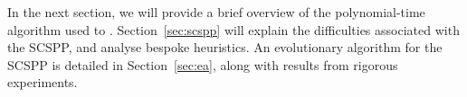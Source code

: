 \documentclass{elsarticle}
\begin{document}
In the next section, we will provide a brief overview of the polynomial-time algorithm used to . Section~\ref{sec:scspp} will explain the difficulties associated with the SCSPP, and analyse bespoke heuristics. An evolutionary algorithm for the SCSPP is detailed in Section~\ref{sec:ea}, along with results from rigorous experiments. 

\begin{comment}
{\color{myOrange}
\begin{itemize}[leftmargin=*]
	\item
	\idone{Lit review, Becker \cite{becker2015}, Lewis \cite{lewis2011} (Lewis TSP method), Hawa \cite{hawa2018}, cite Garraffa \cite{garraffa2016}.}
	\idone{MGPs, cite Lewis \cite{lewis2009}, general formula.}
	\idone{Formal definition COP, vicinal sum constraint.}
	\idone{Example instance $\mathcal{M}$ of COP and possible solution $\mathcal{T}$ using constraint value $\tau = 7$.}
	\idone{Description of subproblem, pack from left to right, minimum scoring distance, single strip problem.}
	\idone{Cite Goulimis \cite{goulimis2004}.}
	\idone{$a_i, b_i, w_i, \mathcal{I}, \mathcal{I}', W, H, \tau, |\mathcal{I}| = n$.}
	\idone{$\tau$ = 70mm approx in industry.}
	\idone{$(a_i, b_i)$, $(b_i, a_i)$ orientations (regular and rotated).}
	\idone{Outermost score widths/elements ignored.}
	\idone{Need to decide order and orientation of items on strip.}
	\idone{$2^{n-1} n!$ distinct orderings, combinatorial explosion.}
	\idone{Show that the subproblem is equivalent to the COP, minimum scoring distance = VSC.}
	\idone{COP/subproblem the strips have infinite width, what if finite width?}
	\idone{Formal defintion of SCSPP, multistrip problem.}
	\idone{Need to decide which strip to pack each item, and \emph{how}, i.e. what order and orientation should the items be in.}
	\idone{BPP special case of SCSPP with $\tau = 0$.}
	\idone{Items can be run through machine individually but extra time/cost.}
	\idone{Two phase approach, EA then postopt, Malaguti \cite{malaguti2008}.}
	\idone{Call the two phase process EAX?}
	\idone{Polynomial-time algorithm for COP Becker \cite{becker2010} Hawa \cite{hawa2018}}
	\idone{Describe rest of paper/layout.}
	\idone{TPP/SDCL ordering still feasible, just not optimal, SCSPP ordering may not be feasible.}
\end{itemize}
}
\end{comment}
\end{document}

